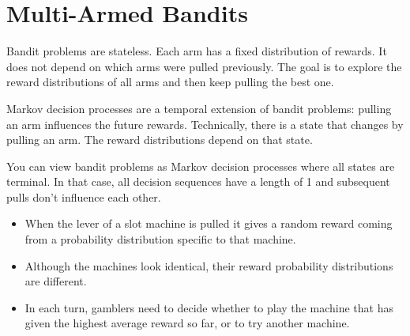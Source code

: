 
\section{Multi-Armed Bandits}

Bandit problems are stateless. Each arm has a fixed distribution of rewards. It does not depend on which arms were pulled previously. The goal is to explore the reward distributions of all arms and then keep pulling the best one.

Markov decision processes are a temporal extension of bandit problems: pulling an arm influences the future rewards. Technically, there is a state that changes by pulling an arm. The reward distributions depend on that state.

You can view bandit problems as Markov decision processes where all states are terminal. In that case, all decision sequences have a length of 1 and subsequent pulls don't influence each other.

\begin{itemize}
	\item When the lever of a slot machine is pulled it gives a random reward coming from a probability distribution specific to that machine.
	\item Although the machines look identical, their reward probability distributions are different. 
	\item In each turn, gamblers need to decide whether to play the machine that has given the highest average reward so far, or to try another machine. 
\end{itemize}
